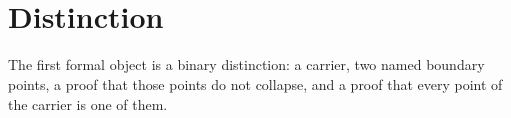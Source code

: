\documentclass[11pt]{article}
\begin{document}
\begin{code}
\AgdaSpace{}%
\AgdaSpace{}%
\AgdaSymbol{(}\AgdaSymbol{;}\AgdaSpace{}%
\AgdaSymbol{;}\AgdaSpace{}%
\AgdaSymbol{)}\<%
\\
\>[0]\AgdaSpace{}%
\AgdaSpace{}%
\AgdaSpace{}%
\AgdaSpace{}%
\AgdaSymbol{(}\AgdaSymbol{;}\AgdaSpace{}%
\AgdaOperator{\AgdaInductiveConstructor{\AgdaUnderscore{},\AgdaUnderscore{}}}\AgdaSymbol{)}\<%
\\
\>[0]\AgdaSpace{}%
\AgdaSpace{}%
\AgdaSpace{}%
\AgdaSpace{}%
\AgdaSymbol{(}\AgdaSymbol{)}\<%
\end{code}

\section{Distinction}

The first formal object is a binary distinction: a carrier, two named
boundary points, a proof that those points do not collapse, and a proof
that every point of the carrier is one of them.
\end{document}
